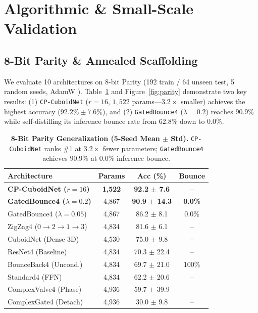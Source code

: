\documentclass[10pt,twocolumn]{article}
\newcommand{\toprule}{\hline\hline}
\newcommand{\midrule}{\hline}
\newcommand{\bottomrule}{\hline\hline}
\newcommand{\citep}[1]{\cite{#1}}
\begin{document}
\section{Algorithmic \& Small-Scale Validation}

\subsection{8-Bit Parity \& Annealed Scaffolding}
We evaluate 10 architectures on 8-bit Parity (192 train / 64 unseen test, 5 random seeds, AdamW \citep{loshchilov2019decoupled}). Table~\ref{tab:parity} and Figure~\ref{fig:parity} demonstrate two key results: (1) \texttt{CP-CuboidNet} ($r=16$, $1{,}522$ params---$3.2\times$ smaller) achieves the highest accuracy ($92.2\% \pm 7.6\%$), and (2) \texttt{GatedBounce4} ($\lambda=0.2$) reaches $90.9\%$ while self-distilling its inference bounce rate from $62.8\%$ down to $0.0\%$.

\begin{table}[t]
\centering
\caption{\textbf{8-Bit Parity Generalization (5-Seed Mean $\pm$ Std).} \texttt{CP-CuboidNet} ranks \#1 at $3.2\times$ fewer parameters; \texttt{GatedBounce4} achieves $90.9\%$ at $0.0\%$ inference bounce.}
\label{tab:parity}
\footnotesize
\setlength{\tabcolsep}{3.5pt}
\begin{tabular}{lccc}
\toprule
\textbf{Architecture} & \textbf{Params} & \textbf{Acc (\%)} & \textbf{Bounce} \\
\midrule
\textbf{CP-CuboidNet ($r=16$)} & \textbf{1,522} & \textbf{92.2 $\pm$ 7.6} & -- \\
\textbf{GatedBounce4 ($\lambda=0.2$)} & 4,867 & \textbf{90.9 $\pm$ 14.3} & \textbf{0.0\%} \\
GatedBounce4 ($\lambda=0.05$) & 4,867 & 86.2 $\pm$ 8.1 & 0.0\% \\
ZigZag4 ($0{\to}2{\to}1{\to}3$) & 4,834 & 81.6 $\pm$ 6.1 & -- \\
CuboidNet (Dense 3D) & 4,530 & 75.0 $\pm$ 9.8 & -- \\
ResNet4 (Baseline) & 4,834 & 70.3 $\pm$ 22.4 & -- \\
BounceBack4 (Uncond.) & 4,834 & 69.7 $\pm$ 21.0 & 100\% \\
Standard4 (FFN) & 4,834 & 62.2 $\pm$ 20.6 & -- \\
ComplexValve4 (Phase) & 4,936 & 59.7 $\pm$ 39.9 & -- \\
ComplexGate4 (Detach) & 4,936 & 30.0 $\pm$ 9.8 & -- \\
\bottomrule
\end{tabular}
\end{table}
\end{document}

